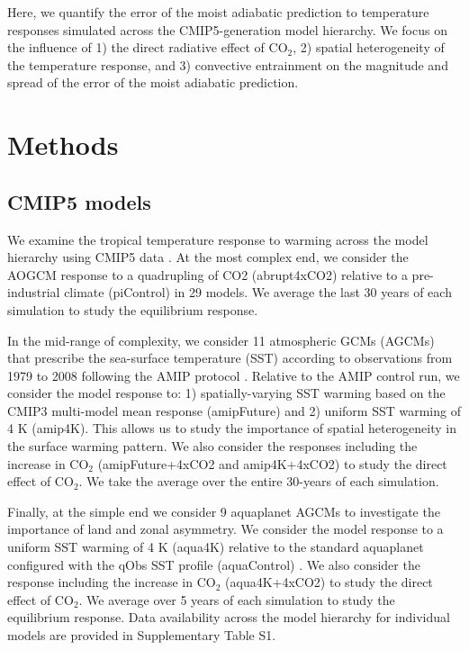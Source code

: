 \documentclass[draft]{agujournal2019}
\begin{document}
Here, we quantify the error of the moist adiabatic prediction to temperature responses simulated across the CMIP5-generation model hierarchy. We focus on the influence of 1) the direct radiative effect of CO$_2$, 2) spatial heterogeneity of the temperature response, and 3) convective entrainment on the magnitude and spread of the error of the moist adiabatic prediction.

\section{Methods}
\subsection{CMIP5 models} \label{data-hierarchy}
We examine the tropical temperature response to warming across the model hierarchy using CMIP5 data \cite{taylor-et-al-2012}. At the most complex end, we consider the AOGCM response to a quadrupling of CO2 (abrupt4xCO2) relative to a pre-industrial climate (piControl) in 29 models. We average the last 30 years of each simulation to study the equilibrium response.

In the mid-range of complexity, we consider 11 atmospheric GCMs (AGCMs) that prescribe the sea-surface temperature (SST) according to observations from 1979 to 2008 following the AMIP protocol \cite{gates-1992}. Relative to the AMIP control run, we consider the model response to: 1) spatially-varying SST warming based on the CMIP3 multi-model mean response (amipFuture) and 2) uniform SST warming of 4 K (amip4K). This allows us to study the importance of spatial heterogeneity in the surface warming pattern. We also consider the responses including the increase in CO$_2$ (amipFuture+4xCO2 and amip4K+4xCO2) to study the direct effect of CO$_2$. We take the average over the entire 30-years of each simulation.

Finally, at the simple end we consider 9 aquaplanet AGCMs to investigate the importance of land and zonal asymmetry. We consider the model response to a uniform SST warming of 4 K (aqua4K) relative to the standard aquaplanet configured with the qObs SST profile (aquaControl) \cite{neale-hoskins-2000}.  We also consider the response including the increase in CO$_2$ (aqua4K+4xCO2) to study the direct effect of CO$_2$. We average over 5 years of each simulation to study the equilibrium response. Data availability across the model hierarchy for individual models are provided in Supplementary Table S1.
\end{document}
